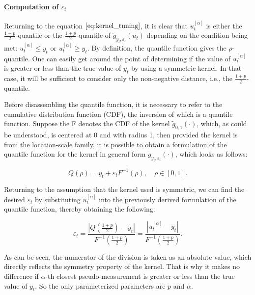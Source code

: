 \paragraph*{Computation of \(\varepsilon_t\)}
Returning to the equation  \(\ref{eq:kernel_tuning}\), it is clear that \(u_t^{[\alpha]}\) is either the \(\frac{1-p}{2}\)-quantile or the \(\frac{1+p}{2}\)-quantile of \(\tilde{g}_{y_t, \varepsilon_t}\left(u_t\right)\) depending on the condition being met: \(u_t^{[\alpha]} \leq y_t\) or \(u_t^{[\alpha]} \geq y_t\). By definition, the quantile function gives the \(\rho\)-quantile. One can easily get around the point of determining if the value of \(u_t^{[\alpha]}\) is greater or less than the true value of \(y_t\) by using a symmetric kernel. In that case, it will be sufficient to consider only the non-negative distance, i.e., the \(\frac{1+p}{2}\)-quantile.

Before disassembling the quantile function, it is necessary to refer to the cumulative distribution function (CDF), the inversion of which is a quantile function. Suppose the F denotes the CDF of the kernel \(\tilde{g}_{0, 1}\left(\cdot\right)\), which, as could be understood, is centered at 0 and with radius 1, then provided the kernel is from the location-scale family, it is possible to obtain a formulation of the quantile function for the kernel in general form \(\tilde{g}_{y_t, \varepsilon_t}\left(\cdot\right)\), which looks as follows:

\begin{equation}
    Q(\rho)=y_t+\varepsilon_t F^{-1}(\rho), \quad \rho \in[0,1].
\end{equation}

Returning to the assumption that the kernel used is symmetric, we can find the desired \(\varepsilon_t\) by substituting \(u_t^{[\alpha]}\) into the previously derived formulation of the quantile function, thereby obtaining the following:

\begin{equation}
    \varepsilon_t=\frac{\left|Q\left(\frac{1+p}{2}\right)-y_t\right|}{F^{-1}\left(\frac{1+p}{2}\right)}=\frac{\left|u_t^{[\alpha]}-y_t\right|}{F^{-1}\left(\frac{1+p}{2}\right)}.
    \label{eq:radius_eq_for_kernel_tuning}
\end{equation}

As can be seen, the numerator of the division is taken as an absolute value, which directly reflects the symmetry property of the kernel. That is why it makes no difference if \(\alpha\)-th closest pseudo-measurement is greater or less than the true value of \(y_t\). So the only parameterized parameters are \(p\) and \(\alpha\).

